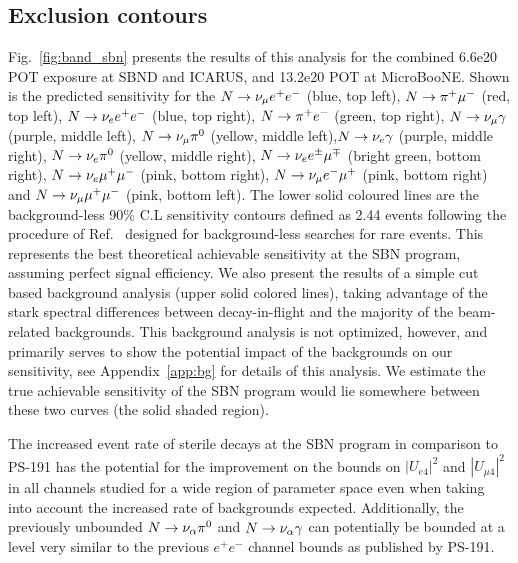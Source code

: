 \documentclass[11pt, a4paper]{article}
\newcommand{\reffig}[1]{Fig.~\ref{#1}}
\newcommand{\refapp}[1]{Appendix~\ref{#1}}
\newcommand{\refref}[1]{Ref.~\cite{#1}}
\def\muboone{MicroBooNE}
\def\ster{\ensuremath N}
\begin{document}
\subsection{Exclusion contours}
%
\reffig{fig:band_sbn} presents the results of this analysis for the combined 6.6e20 POT exposure at SBND and ICARUS, and 13.2e20 POT at \muboone. Shown is the predicted sensitivity for the $\ster \rightarrow \nu_\mu e^+e^-$ (blue, top left), $\ster \rightarrow \pi^+ \mu^-$ (red, top left), $\ster \rightarrow \nu_e e^+ e^-$ (blue, top right),  $\ster \rightarrow \pi^+ e^-$ (green, top right), $\ster \rightarrow \nu_\mu \gamma$ (purple, middle left), $\ster \rightarrow \nu_\mu \pi^0$ (yellow, middle left),$\ster \rightarrow \nu_e \gamma$ (purple, middle right), $\ster \rightarrow \nu_e \pi^0$ (yellow, middle right), $\ster \rightarrow \nu_e e^\pm \mu^\mp $ (bright green, bottom right), $\ster \rightarrow \nu_e \mu^+ \mu^- $ (pink, bottom right),  $\ster \rightarrow \nu_\mu e^- \mu^+$ (pink, bottom right) and $\ster \rightarrow \nu_\mu \mu^+ \mu^- $ (pink, bottom left). The lower solid coloured lines are the background-less 90\% C.L sensitivity contours defined as 2.44 events following the procedure of \refref{Feldman:1997qc} designed for
background-less searches for rare events. This represents the best theoretical achievable sensitivity at the SBN program, assuming perfect signal efficiency. We also present the results of a simple cut based background analysis (upper solid colored lines), taking advantage of the stark spectral differences between decay-in-flight and the majority of the beam-related backgrounds. This background analysis is not optimized, however, and primarily serves to show the potential impact of the backgrounds on our sensitivity,  see \refapp{app:bg} for details of this analysis. We estimate the true achievable sensitivity of the SBN program would lie somewhere
between these two curves (the solid shaded region). 

The increased event rate of sterile decays at the SBN program in comparison to PS-191 has the potential for the improvement on the bounds on $|U_{e4}|^2$ and $|U_{\mu 4}|^2$ in all channels studied for a wide region of parameter space even when taking into account the increased rate of backgrounds expected. Additionally, the previously unbounded $\ster \rightarrow \nu_\alpha \pi^0$ and $\ster \rightarrow \nu_\alpha \gamma$ can potentially be bounded at a level very similar to the previous $e^+ e^-$ channel bounds as published by PS-191.
\end{document}

